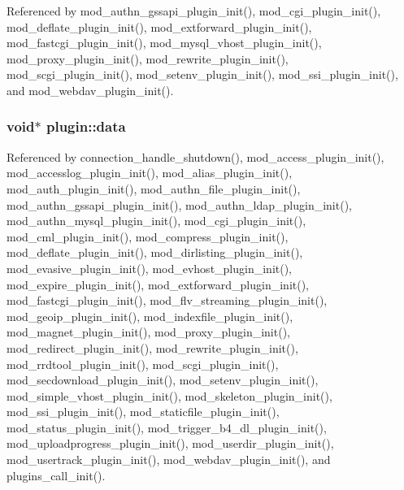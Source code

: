 Referenced by mod\-\_\-authn\-\_\-gssapi\-\_\-plugin\-\_\-init(), mod\-\_\-cgi\-\_\-plugin\-\_\-init(), mod\-\_\-deflate\-\_\-plugin\-\_\-init(), mod\-\_\-extforward\-\_\-plugin\-\_\-init(), mod\-\_\-fastcgi\-\_\-plugin\-\_\-init(), mod\-\_\-mysql\-\_\-vhost\-\_\-plugin\-\_\-init(), mod\-\_\-proxy\-\_\-plugin\-\_\-init(), mod\-\_\-rewrite\-\_\-plugin\-\_\-init(), mod\-\_\-scgi\-\_\-plugin\-\_\-init(), mod\-\_\-setenv\-\_\-plugin\-\_\-init(), mod\-\_\-ssi\-\_\-plugin\-\_\-init(), and mod\-\_\-webdav\-\_\-plugin\-\_\-init().

\hypertarget{structplugin_aa5c0338878875f24bcaf3bb4e3f60bc6}{
\subsubsection[{data}]{\setlength{\rightskip}{0pt plus 5cm}void$\ast$ plugin\-::data}}\label{structplugin_aa5c0338878875f24bcaf3bb4e3f60bc6}


Referenced by connection\-\_\-handle\-\_\-shutdown(), mod\-\_\-access\-\_\-plugin\-\_\-init(), mod\-\_\-accesslog\-\_\-plugin\-\_\-init(), mod\-\_\-alias\-\_\-plugin\-\_\-init(), mod\-\_\-auth\-\_\-plugin\-\_\-init(), mod\-\_\-authn\-\_\-file\-\_\-plugin\-\_\-init(), mod\-\_\-authn\-\_\-gssapi\-\_\-plugin\-\_\-init(), mod\-\_\-authn\-\_\-ldap\-\_\-plugin\-\_\-init(), mod\-\_\-authn\-\_\-mysql\-\_\-plugin\-\_\-init(), mod\-\_\-cgi\-\_\-plugin\-\_\-init(), mod\-\_\-cml\-\_\-plugin\-\_\-init(), mod\-\_\-compress\-\_\-plugin\-\_\-init(), mod\-\_\-deflate\-\_\-plugin\-\_\-init(), mod\-\_\-dirlisting\-\_\-plugin\-\_\-init(), mod\-\_\-evasive\-\_\-plugin\-\_\-init(), mod\-\_\-evhost\-\_\-plugin\-\_\-init(), mod\-\_\-expire\-\_\-plugin\-\_\-init(), mod\-\_\-extforward\-\_\-plugin\-\_\-init(), mod\-\_\-fastcgi\-\_\-plugin\-\_\-init(), mod\-\_\-flv\-\_\-streaming\-\_\-plugin\-\_\-init(), mod\-\_\-geoip\-\_\-plugin\-\_\-init(), mod\-\_\-indexfile\-\_\-plugin\-\_\-init(), mod\-\_\-magnet\-\_\-plugin\-\_\-init(), mod\-\_\-proxy\-\_\-plugin\-\_\-init(), mod\-\_\-redirect\-\_\-plugin\-\_\-init(), mod\-\_\-rewrite\-\_\-plugin\-\_\-init(), mod\-\_\-rrdtool\-\_\-plugin\-\_\-init(), mod\-\_\-scgi\-\_\-plugin\-\_\-init(), mod\-\_\-secdownload\-\_\-plugin\-\_\-init(), mod\-\_\-setenv\-\_\-plugin\-\_\-init(), mod\-\_\-simple\-\_\-vhost\-\_\-plugin\-\_\-init(), mod\-\_\-skeleton\-\_\-plugin\-\_\-init(), mod\-\_\-ssi\-\_\-plugin\-\_\-init(), mod\-\_\-staticfile\-\_\-plugin\-\_\-init(), mod\-\_\-status\-\_\-plugin\-\_\-init(), mod\-\_\-trigger\-\_\-b4\-\_\-dl\-\_\-plugin\-\_\-init(), mod\-\_\-uploadprogress\-\_\-plugin\-\_\-init(), mod\-\_\-userdir\-\_\-plugin\-\_\-init(), mod\-\_\-usertrack\-\_\-plugin\-\_\-init(), mod\-\_\-webdav\-\_\-plugin\-\_\-init(), and plugins\-\_\-call\-\_\-init().

